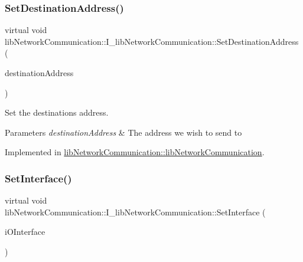 \mbox{\label{classlibNetworkCommunication_1_1I__libNetworkCommunication_ad156b40d434a15fb553873f892dd2d0c}} 
\subsubsection{\texorpdfstring{SetDestinationAddress()}{SetDestinationAddress()}}
{\footnotesize\ttfamily virtual void lib\+Network\+Communication\+::\+I\+\_\+lib\+Network\+Communication\+::\+Set\+Destination\+Address (\begin{DoxyParamCaption}\item[{char $\ast$}]{destination\+Address }\end{DoxyParamCaption})\hspace{0.3cm}{\ttfamily [pure virtual]}}



Set the destination\textquotesingle{}s address. 


\begin{DoxyParams}{Parameters}
{\em destination\+Address} & The address we wish to send to \\
\hline
\end{DoxyParams}


Implemented in \mbox{\hyperlink{classlibNetworkCommunication_1_1libNetworkCommunication_a124f9b26150321f01f0998e558bf1d76}{lib\+Network\+Communication\+::lib\+Network\+Communication}}.

\mbox{\label{classlibNetworkCommunication_1_1I__libNetworkCommunication_a7f23008156d44d5f6db117243ee687e6}} 
\subsubsection{\texorpdfstring{SetInterface()}{SetInterface()}}
{\footnotesize\ttfamily virtual void lib\+Network\+Communication\+::\+I\+\_\+lib\+Network\+Communication\+::\+Set\+Interface (\begin{DoxyParamCaption}\item[{std\+::shared\+\_\+ptr$<$ \mbox{\hyperlink{classcFunctions_1_1I__cNetComm}{c\+Functions\+::\+I\+\_\+c\+Net\+Comm}} $>$}]{i\+O\+Interface }\end{DoxyParamCaption})\hspace{0.3cm}{\ttfamily [pure virtual]}}



